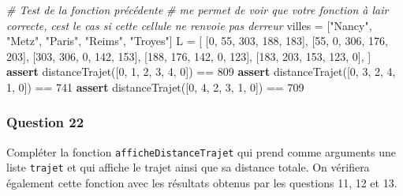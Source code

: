 \documentclass[
  paper=a4,
  ,captions=tableheading
]{scrartcl}
\newenvironment{Shaded}{}{}
\newcommand{\CommentTok}[1]{\textcolor[rgb]{0.38,0.63,0.69}{\textit{#1}}}
\newcommand{\ControlFlowTok}[1]{\textcolor[rgb]{0.00,0.44,0.13}{\textbf{#1}}}
\newcommand{\DecValTok}[1]{\textcolor[rgb]{0.25,0.63,0.44}{#1}}
\newcommand{\NormalTok}[1]{#1}
\newcommand{\OperatorTok}[1]{\textcolor[rgb]{0.40,0.40,0.40}{#1}}
\newcommand{\StringTok}[1]{\textcolor[rgb]{0.25,0.44,0.63}{#1}}
\begin{document}
\begin{Shaded}
\begin{Highlighting}[]
\CommentTok{\# Test de la fonction précédente}
\CommentTok{\# me permet de voir que votre fonction à l\textquotesingle{}air correcte, c\textquotesingle{}est le cas si cette cellule ne renvoie pas d\textquotesingle{}erreur}
\NormalTok{villes }\OperatorTok{=}\NormalTok{ [}\StringTok{"Nancy"}\NormalTok{, }\StringTok{"Metz"}\NormalTok{, }\StringTok{"Paris"}\NormalTok{, }\StringTok{"Reims"}\NormalTok{, }\StringTok{"Troyes"}\NormalTok{]}
\NormalTok{L }\OperatorTok{=}\NormalTok{ [}
\NormalTok{    [}\DecValTok{0}\NormalTok{, }\DecValTok{55}\NormalTok{, }\DecValTok{303}\NormalTok{, }\DecValTok{188}\NormalTok{, }\DecValTok{183}\NormalTok{],}
\NormalTok{    [}\DecValTok{55}\NormalTok{, }\DecValTok{0}\NormalTok{, }\DecValTok{306}\NormalTok{, }\DecValTok{176}\NormalTok{, }\DecValTok{203}\NormalTok{],}
\NormalTok{    [}\DecValTok{303}\NormalTok{, }\DecValTok{306}\NormalTok{, }\DecValTok{0}\NormalTok{, }\DecValTok{142}\NormalTok{, }\DecValTok{153}\NormalTok{],}
\NormalTok{    [}\DecValTok{188}\NormalTok{, }\DecValTok{176}\NormalTok{, }\DecValTok{142}\NormalTok{, }\DecValTok{0}\NormalTok{, }\DecValTok{123}\NormalTok{],}
\NormalTok{    [}\DecValTok{183}\NormalTok{, }\DecValTok{203}\NormalTok{, }\DecValTok{153}\NormalTok{, }\DecValTok{123}\NormalTok{, }\DecValTok{0}\NormalTok{],}
\NormalTok{]}
\ControlFlowTok{assert}\NormalTok{ distanceTrajet([}\DecValTok{0}\NormalTok{, }\DecValTok{1}\NormalTok{, }\DecValTok{2}\NormalTok{, }\DecValTok{3}\NormalTok{, }\DecValTok{4}\NormalTok{, }\DecValTok{0}\NormalTok{]) }\OperatorTok{==} \DecValTok{809}
\ControlFlowTok{assert}\NormalTok{ distanceTrajet([}\DecValTok{0}\NormalTok{, }\DecValTok{3}\NormalTok{, }\DecValTok{2}\NormalTok{, }\DecValTok{4}\NormalTok{, }\DecValTok{1}\NormalTok{, }\DecValTok{0}\NormalTok{]) }\OperatorTok{==} \DecValTok{741}
\ControlFlowTok{assert}\NormalTok{ distanceTrajet([}\DecValTok{0}\NormalTok{, }\DecValTok{4}\NormalTok{, }\DecValTok{2}\NormalTok{, }\DecValTok{3}\NormalTok{, }\DecValTok{1}\NormalTok{, }\DecValTok{0}\NormalTok{]) }\OperatorTok{==} \DecValTok{709}
\end{Highlighting}
\end{Shaded}

\hypertarget{question-22}{%
\subsubsection{Question 22}\label{question-22}}

Compléter la fonction \texttt{afficheDistanceTrajet} qui prend comme
arguments une liste \texttt{trajet} et qui affiche le trajet ainsi que
sa distance totale. On vérifiera également cette fonction avec les
résultats obtenus par les questions 11, 12 et 13.
\end{document}
